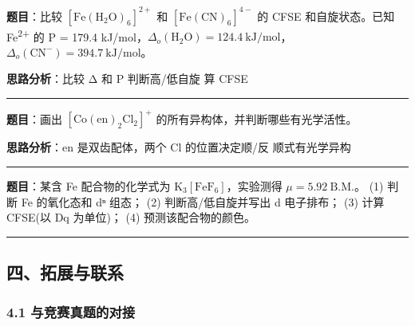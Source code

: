 \textbf{题目}：比较 \([\mathrm{Fe(H_2O)_6}]^{2+}\) 和 \([\mathrm{Fe(CN)_6}]^{4-}\) 的 CFSE 和自旋状态。已知 Fe\textsuperscript{2+} 的 P = 179.4 kJ/mol，\(\Delta_o(\mathrm{H_2O}) = 124.4\ \mathrm{kJ/mol}\)，\(\Delta_o(\mathrm{CN^-}) = 394.7\ \mathrm{kJ/mol}\)。

\textbf{思路分析}：比较 Δ 和 P \箭 判断高/低自旋 \箭 算 CFSE

\begin{center}\rule{0.5\linewidth}{0.5pt}\end{center}

\textbf{题目}：画出 \([\mathrm{Co(en)_2Cl_2}]^+\) 的所有异构体，并判断哪些有光学活性。

\textbf{思路分析}：en 是双齿配体，两个 Cl 的位置决定顺/反 \箭 顺式有光学异构

\begin{center}\rule{0.5\linewidth}{0.5pt}\end{center}

\textbf{题目}：某含 Fe 配合物的化学式为 \(\mathrm{K_3[FeF_6]}\)，实验测得 \(\mu = 5.92\ \mathrm{B.M.}\)。
(1) 判断 Fe 的氧化态和 dⁿ 组态；
(2) 判断高/低自旋并写出 d 电子排布；
(3) 计算 CFSE(以 Dq 为单位)；
(4) 预测该配合物的颜色。

\begin{center}\rule{0.5\linewidth}{0.5pt}\end{center}

\subsection{四、拓展与联系}\label{ux56dbux62d3ux5c55ux4e0eux8054ux7cfb}

\subsubsection{4.1 与竞赛真题的对接}\label{ux4e0eux7adeux8d5bux771fux9898ux7684ux5bf9ux63a5}


